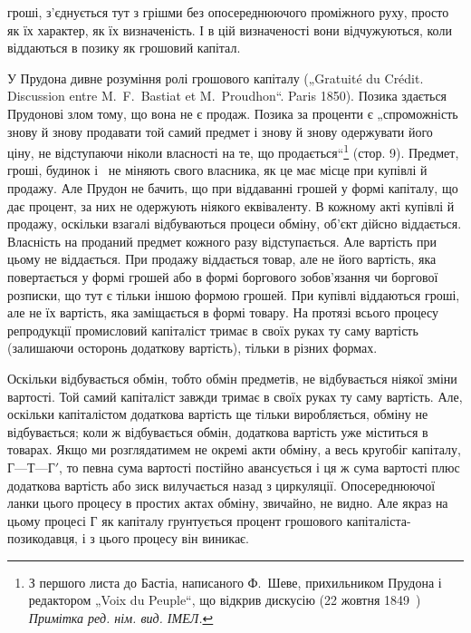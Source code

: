 \parcont{}  %
гроші, з’єднується тут з грішми без опосереднюючого проміжного
руху, просто як їх характер, як їх визначеність. І в цій
визначеності вони відчужуються, коли віддаються в позику як
грошовий капітал.

У Прудона дивне розуміння ролі грошового капіталу („Gratuité
du Crédit. Discussion entre M.~F.~Bastiat et M.~Proudhon“.
Paris 1850). Позика здається Прудонові злом тому, що вона не
є продаж. Позика за проценти є „спроможність знову й знову продавати
той самий предмет і знову й знову одержувати його ціну,
не відступаючи ніколи власності на те, що продається“\footnote*{
З першого листа до Бастіа, написаного Ф.~Шеве, прихильником Прудона
і редактором „Voix du Peuple“, що відкрив дискусію (22 жовтня 1849~) \emph{Примітка
ред. нім. вид. ІМЕЛ.}
} (стор. 9).
Предмет, гроші, будинок і~ не міняють свого власника, як
це має місце при купівлі й продажу. Але Прудон не бачить,
що при віддаванні грошей у формі капіталу, що дає процент, за
них не одержують ніякого еквіваленту. В кожному акті купівлі
й продажу, оскільки взагалі відбуваються процеси обміну, об’єкт
дійсно віддається. Власність на проданий предмет кожного разу
відступається. Але вартість при цьому не віддається. При продажу
віддається товар, але не його вартість, яка повертається
у формі грошей або в формі боргового зобов’язання чи боргової
розписки, що тут є тільки іншою формою грошей. При купівлі віддаються
гроші, але не їх вартість, яка заміщається в формі товару.
На протязі всього процесу репродукції промисловий капіталіст
тримає в своїх руках ту саму вартість (залишаючи
осторонь додаткову вартість), тільки в різних формах.

Оскільки відбувається обмін, тобто обмін предметів, не відбувається
ніякої зміни вартості. Той самий капіталіст завжди
тримає в своїх руках ту саму вартість. Але, оскільки капіталістом
додаткова вартість ще тільки виробляється, обміну не відбувається;
коли ж відбувається обмін, додаткова вартість уже
міститься в товарах. Якщо ми розглядатимем не окремі акти
обміну, а весь кругобіг капіталу, $Г — Т — Г'$, то певна сума вартості
постійно авансується і ця ж сума вартості плюс додаткова вартість
або зиск вилучається назад з циркуляції. Опосереднюючої
ланки цього процесу в простих актах обміну, звичайно, не видно.
Але якраз на цьому процесі $Г$ як капіталу грунтується процент
грошового капіталіста-позикодавця, і з цього процесу він
виникає.

